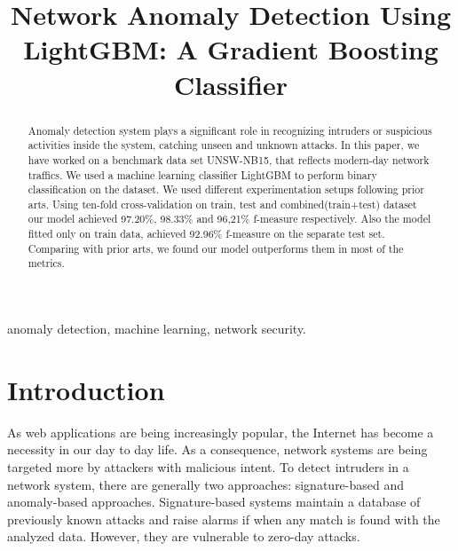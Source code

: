 \documentclass[14pt, conference]{IEEEtran}
\begin{document}
\title{Network Anomaly Detection Using LightGBM: A Gradient Boosting Classifier}

\author{

}

\maketitle

\begin{abstract}
Anomaly detection system plays a significant role in recognizing intruders or suspicious activities inside the system, catching unseen and unknown attacks. In this paper, we have worked on a benchmark data set UNSW-NB15, that reflects modern-day network traffics. We used a machine learning classifier LightGBM to perform binary classification on the dataset. We used different experimentation setups following prior arts. Using ten-fold cross-validation on train, test and combined(train+test) dataset our model achieved 97.20\%, 98.33\% and 96,21\% f-measure respectively. Also the model fitted only on train data, achieved 92.96\% f-measure on the separate test set. Comparing with prior arts, we found our model outperforms them in most of the metrics.
\end{abstract}

\begin{IEEEkeywords}
anomaly detection, machine learning,  network security.
\end{IEEEkeywords}

\section{Introduction}
As web applications are being increasingly popular, the Internet has become a necessity in our day to day life. As a consequence, network systems are being targeted more by attackers with malicious intent. To detect intruders in a network system, there are generally two approaches: signature-based and anomaly-based approaches. Signature-based systems maintain a database of previously known attacks and raise alarms if when any match is found with the analyzed data. However, they are vulnerable to zero-day attacks.
\end{document}
